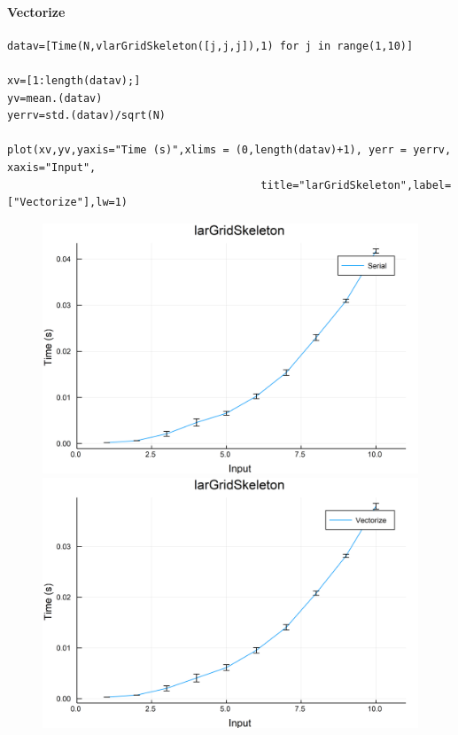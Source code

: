 \documentclass{article}
\begin{document}
\paragraph{Vectorize}
\begin{flushleft}\small
\begin{list}{}{} \item
    \begin{Verbatim}[tabsize=4]
datav=[Time(N,vlarGridSkeleton([j,j,j]),1) for j in range(1,10)]

xv=[1:length(datav);]
yv=mean.(datav)
yerrv=std.(datav)/sqrt(N)

plot(xv,yv,yaxis="Time (s)",xlims = (0,length(datav)+1), yerr = yerrv, xaxis="Input", 
                                        title="larGridSkeleton",label=["Vectorize"],lw=1)
    \end{Verbatim}
\end{list}
\end{flushleft}
\begin{figure}[h!]
\centering
\includegraphics[scale=0.06]{larGridSkeletonSer.png}
\includegraphics[scale=0.06]{larGridSkeletonVec.png}
\end{figure}
\end{document}
